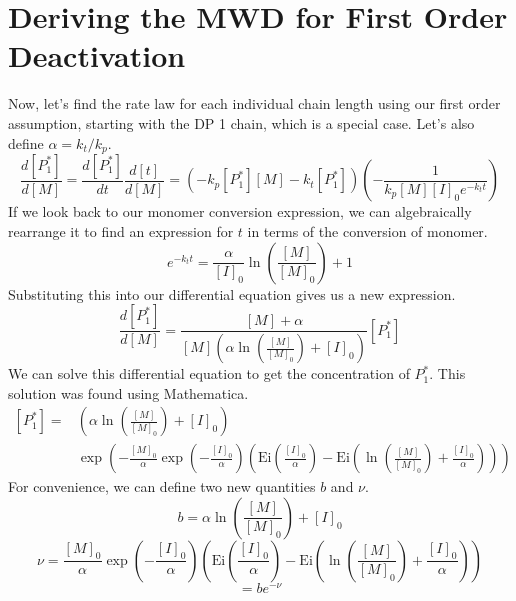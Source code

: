 \documentclass[12pt]{article}
\begin{document}
\section*{Deriving the MWD for First Order Deactivation}
Now, let's find the rate law for each individual chain length using our first order assumption, starting with the DP 1 chain, which is a special case. Let's also define $\alpha=k_t/k_p$.
\begin{equation}
  \frac{d[P_1^*]}{d[M]} = \frac{d[P_1^*]}{dt}\frac{d[t]}{d[M]}=\left(-k_p[P_1^*][M]-k_t[P_1^*]\right)\left(-\frac{1}{k_p[M][I]_0e^{-k_tt}}\right)
\end{equation}
If we look back to our monomer conversion expression, we can algebraically rearrange it to find an expression for $t$ in terms of the conversion of monomer.
\begin{equation}
  e^{-k_tt}=\frac{\alpha}{[I]_0}\ln\left(\frac{[M]}{[M]_0}\right)+1
\end{equation}
Substituting this into our differential equation gives us a new expression.
\begin{equation}
  \frac{d[P_1^*]}{d[M]} = \frac{[M]+\alpha}{[M]\left(\alpha\ln\left(\frac{[M]}{[M]_0}\right)+[I]_0\right)}[P_1^*]
\end{equation}
We can solve this differential equation to get the concentration of $P_1^*$. This solution was found using Mathematica.
\begin{equation}
  \begin{split}
    [P_1^*]= & \left(\alpha\ln\left(\frac{[M]}{[M]_0}\right)+[I]_0\right) \\
    & \exp\left(-\frac{[M]_0}{\alpha}\exp\left(-\frac{[I]_0}{\alpha}\right)\left(\text{Ei}\left(\frac{[I]_0}{\alpha}\right)-\text{Ei}\left(\ln\left(\frac{[M]}{[M]_0}\right)+\frac{[I]_0}{\alpha}\right)\right)\right)
  \end{split}
\end{equation}
For convenience, we can define two new quantities $b$ and $\nu$.
\begin{equation}
  b=\alpha\ln\left(\frac{[M]}{[M]_0}\right)+[I]_0
\end{equation}
\begin{equation}
  \nu = \frac{[M]_0}{\alpha}\exp\left(-\frac{[I]_0}{\alpha}\right)\left(\text{Ei}\left(\frac{[I]_0}{\alpha}\right)-\text{Ei}\left(\ln\left(\frac{[M]}{[M]_0}\right)+\frac{[I]_0}{\alpha}\right)\right)
\end{equation}
\begin{equation}
  [P_1^*]=be^{-\nu}
\end{equation}
\end{document}
